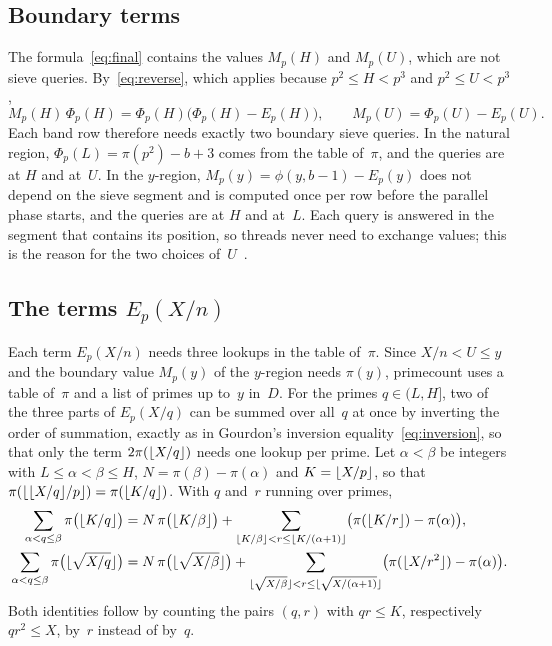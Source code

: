 \documentclass[11pt,a4paper]{amsart}
\numberwithin{equation}{section}
\DeclarePairedDelimiter{\floor}{\lfloor}{\rfloor}
\begin{document}
\subsection{Boundary terms}\label{sec:boundary}
The formula~\eqref{eq:final} contains the values $M_p(H)$ and $M_p(U)$, which
are not sieve queries. By~\eqref{eq:reverse}, which applies because
$p^2\le H<p^3$ and $p^2\le U<p^3$,
\[
  M_p(H)\,\Phi_p(H)=\Phi_p(H)\bigl(\Phi_p(H)-E_p(H)\bigr),\qquad
  M_p(U)=\Phi_p(U)-E_p(U).
\]
Each band row therefore needs exactly two boundary sieve queries. In the
natural region, $\Phi_p(L)=\pi(p^2)-b+3$ comes from the table of~$\pi$, and the
queries are at $H$ and at~$U$. In the $y$-region, $M_p(y)=\phi(y,b-1)-E_p(y)$ does not
depend on the sieve segment and is computed once per row before the parallel phase
starts, and the queries are at $H$ and at~$L$. Each query is answered in the
segment that contains its position, so threads never need to exchange values;
this is the reason for the two choices of~$U$~\cite[Table~5]{Lin2026}.

\subsection{The terms \texorpdfstring{$E_p(X/n)$}{E\_p(X/n)}}\label{sec:Ep}
Each term $E_p(X/n)$ needs three lookups in the table of~$\pi$. Since
$X/n<U\le y$ and the boundary value $M_p(y)$ of the $y$-region needs $\pi(y)$,
primecount uses a table of~$\pi$ and a list of primes up to~$y$ in~$D$. For the primes
$q\in(L,H]$, two of the three parts of $E_p(X/q)$ can be summed over all~$q$ at
once by inverting the order of summation, exactly as in Gourdon's inversion
equality~\eqref{eq:inversion}, so that only the term $2\pi(\floor{X/q})$ needs one
lookup per prime. Let $\alpha<\beta$ be integers with $L\le\alpha<\beta\le H$,
$N=\pi(\beta)-\pi(\alpha)$ and $K=\floor{X/p}$, so that
$\pi(\floor{\floor{X/q}/p})=\pi(\floor{K/q})$. With $q$ and~$r$ running over
primes,
\begin{align*}
  \sum_{\alpha<q\le\beta}\pi\bigl(\floor{K/q}\bigr)
  &=N\,\pi\bigl(\floor{K/\beta}\bigr)
   +\sum_{\floor{K/\beta}<r\le\floor{K/(\alpha+1)}}
    \bigl(\pi(\floor{K/r})-\pi(\alpha)\bigr),\\
  \sum_{\alpha<q\le\beta}\pi\bigl(\floor{\sqrt{X/q}}\bigr)
  &=N\,\pi\bigl(\floor{\sqrt{X/\beta}}\bigr)
   +\sum_{\floor{\sqrt{X/\beta}}<r\le\floor{\sqrt{X/(\alpha+1)}}}
    \bigl(\pi(\floor{X/r^2})-\pi(\alpha)\bigr).
\end{align*}
Both identities follow by counting the pairs $(q,r)$ with $qr\le K$,
respectively $qr^2\le X$, by~$r$ instead of by~$q$.
\end{document}
